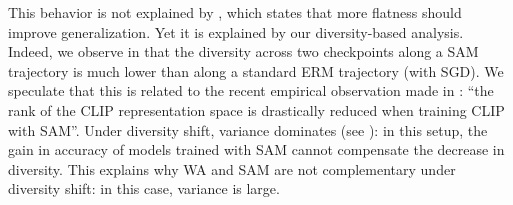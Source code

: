 This behavior is not explained by , which states that more flatness should improve \ood generalization. Yet it is explained by our diversity-based analysis.
Indeed, we observe in  that the diversity across two checkpoints along a SAM trajectory is much lower than along a standard ERM trajectory (with SGD).
We speculate that this is related to the recent empirical observation made in \cite{dallev2}: \enquote{the rank of the CLIP representation space is drastically reduced when training CLIP with SAM}.
Under diversity shift, variance dominates (see ): in this setup, the gain in accuracy of models trained with SAM cannot compensate the decrease in diversity. This explains why WA and SAM are not complementary under diversity shift: in this case, variance is large.
\FloatBarrier
\clearpage

